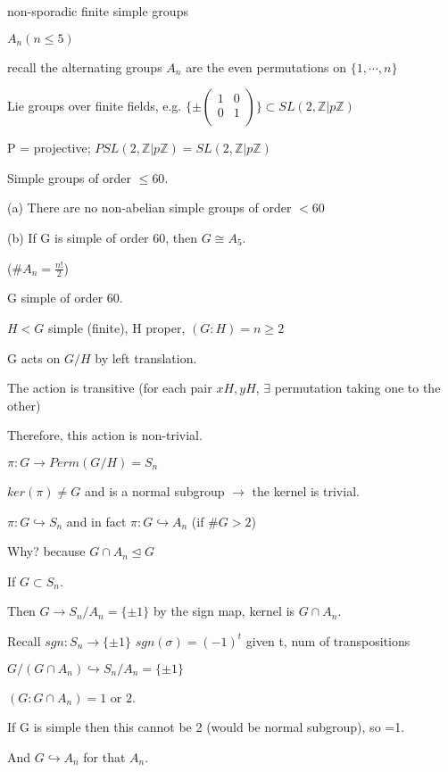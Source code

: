 \documentclass[12pt]{article}
\begin{document}
\noindent
non-sporadic finite simple groups

$A_n (n \leq 5)$

recall the alternating groups $A_n$ are the even permutations on $\{1, \cdots, n\}$

Lie groups over finite fields, e.g. $\{\pm \begin{pmatrix} 1 & 0 \\ 0 & 1 \\ \end{pmatrix}\} \subset SL(2, \mathds{Z}|p\mathds{Z})$

P = projective; $PSL(2, \mathds{Z}|p\mathds{Z}) = SL(2, \mathds{Z}|p\mathds{Z})$

\noindent
Simple groups of order $\leq 60$.

(a) There are no non-abelian simple groups of order $< 60$

(b) If G is simple of order 60, then $G \cong A_5$.

($\#A_n = \frac{n!}{2}$)

\noindent
G simple of order 60.

$H < G$ simple (finite), H proper, $(G: H) = n \geq 2$

G acts on $G\slash H$ by left translation.

The action is transitive (for each pair $xH, yH$, $\exists$ permutation taking one to the other)

Therefore, this action is non-trivial.

$\pi : G \to Perm(G\slash H) = S_n$

$ker(\pi) \neq G$ and is a normal subgroup $\to$ the kernel is trivial.

$\pi: G \hookrightarrow S_n$ and in fact $\pi: G \hookrightarrow A_n$ (if $\#G > 2$)

\noindent
Why? because $G \cap A_n \trianglelefteq G$

If $G \subset S_n$.

Then $G \to S_n/A_n = \{\pm 1\}$ by the sign map, kernel is $G \cap A_n$.

Recall $sgn: S_n \to \{\pm 1\}$ $sgn(\sigma) = (-1)^t$ given t, num of transpositions

$G/(G \cap A_n) \hookrightarrow S_n/A_n = \{\pm 1\}$

$(G : G \cap A_n) = 1$ or $2$.

If G is simple then this cannot be 2 (would be normal subgroup), so =1.

And $G \hookrightarrow A_n$ for that $A_n$.
\end{document}
